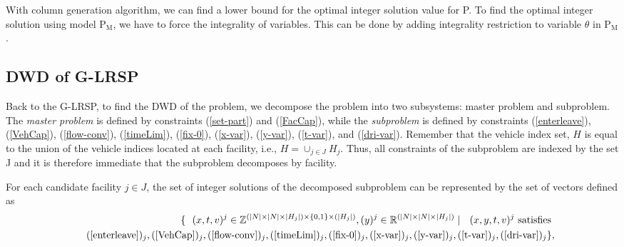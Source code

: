 
With column generation algorithm, we can find a lower bound for the optimal integer 
solution value for P. To find the optimal integer solution using model P$_{\mbox{M}}$, 
we have to force the integrality of variables. This can be done by adding integrality 
restriction to variable $\theta$ in  P$_{\mbox{M}}$. 



\subsection{DWD of G-LRSP}

Back to the G-LRSP, to find the DWD of the problem, 
we decompose the problem into two subsystems: master problem and subproblem.
The {\em master problem} is defined by constraints (\ref{set-part}) and (\ref{FacCap}),
while the {\em subproblem} is defined by constraints (\ref{enterleave}), (\ref{VehCap}), 
(\ref{flow-conv}), (\ref{timeLim}), (\ref{fix-0}), (\ref{x-var}), (\ref{y-var}), 
(\ref{t-var}), and (\ref{dri-var}).
Remember that the vehicle index set, $H$ is 
equal to the union of the vehicle indices located at each facility, i.e., 
$H = \cup_{j \in J}H_j$. Thus, all constraints of the subproblem are 
indexed by the set J and it is therefore immediate
that the subproblem decomposes by facility. 

For each candidate facility $j \in J$, the set of integer solutions of the 
decomposed subproblem can be represented by the set of vectors defined as
\begin{eqnarray}
& & \{ \ \  (x, t, v)^j \in \mathbb{Z}^{(|N|\times |N| \times |H_j|) \times \{0, 1\} \times(|H_j|)}, 
 (y)^j \in \mathbb{R}^{(|N|\times |N| \times |H_j|)}  \mid  \ \  (x, y, t, v)^j \mbox{ satisfies } \nonumber\\
& &  \ \ (\ref{enterleave})_j, 
 (\ref{VehCap})_j, (\ref{flow-conv})_j, (\ref{timeLim})_j, (\ref{fix-0})_j, 
(\ref{x-var})_j, (\ref{y-var})_j, (\ref{t-var})_j, (\ref{dri-var})_j \}, \label{subsys} 
\end{eqnarray}

